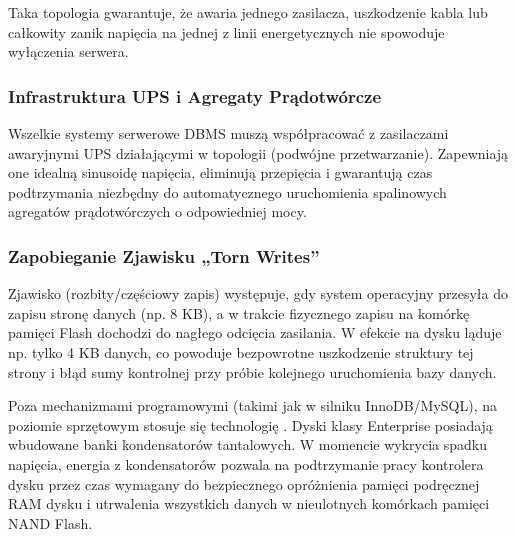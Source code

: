 \documentclass[letterpaper,10pt,polish]{sphinxmanual}
\begin{document}
\sphinxAtStartPar
Taka topologia gwarantuje, że awaria jednego zasilacza, uszkodzenie kabla lub całkowity zanik napięcia na jednej z linii energetycznych nie spowoduje wyłączenia serwera.


\subsubsection{Infrastruktura UPS i Agregaty Prądotwórcze}
\label{\detokenize{rozdzia_u0142_2/rozdzia_u0142_21/index:infrastruktura-ups-i-agregaty-pradotworcze}}
\sphinxAtStartPar
Wszelkie systemy serwerowe DBMS muszą współpracować z zasilaczami awaryjnymi UPS działającymi w topologii  (podwójne przetwarzanie). Zapewniają one idealną sinusoidę napięcia, eliminują przepięcia i gwarantują czas podtrzymania niezbędny do automatycznego uruchomienia spalinowych agregatów prądotwórczych o odpowiedniej mocy.


\subsubsection{Zapobieganie Zjawisku „Torn Writes”}
\label{\detokenize{rozdzia_u0142_2/rozdzia_u0142_21/index:zapobieganie-zjawisku-torn-writes}}
\sphinxAtStartPar
Zjawisko  (rozbity/częściowy zapis) występuje, gdy system operacyjny przesyła do zapisu stronę danych (np. 8 KB), a w trakcie fizycznego zapisu na komórkę pamięci Flash dochodzi do nagłego odcięcia zasilania. W efekcie na dysku ląduje np. tylko 4 KB danych, co powoduje bezpowrotne uszkodzenie struktury tej strony i błąd sumy kontrolnej przy próbie kolejnego uruchomienia bazy danych.

\sphinxAtStartPar
Poza mechanizmami programowymi (takimi jak  w silniku InnoDB/MySQL), na poziomie sprzętowym stosuje się technologię . Dyski klasy Enterprise posiadają wbudowane banki kondensatorów tantalowych. W momencie wykrycia spadku napięcia, energia z kondensatorów pozwala na podtrzymanie pracy kontrolera dysku przez czas wymagany do bezpiecznego opróżnienia pamięci podręcznej RAM dysku i utrwalenia wszystkich danych w nieulotnych komórkach pamięci NAND Flash.
\end{document}
